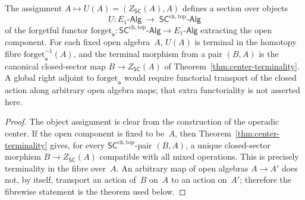 \begin{corollary}
\label{cor:center-functor}
The assignment $A \mapsto U(A) = (Z_{\mathsf{SC}}(A), A)$ defines a
section over objects
\[
U\colon
E_1\text{-}\mathsf{Alg}
\;\longrightarrow\;
\mathsf{SC}^{\mathrm{ch,top}}\text{-}\mathsf{Alg}
\]
of the forgetful functor
$\mathrm{forget}_{\mathsf{o}}\colon
\mathsf{SC}^{\mathrm{ch,top}}\text{-}\mathsf{Alg}
\to E_1\text{-}\mathsf{Alg}$
extracting the open component. For each fixed open algebra~$A$,
$U(A)$ is terminal in the homotopy fibre
$\mathrm{forget}_{\mathsf{o}}^{-1}(A)$, and the terminal morphism
from a pair $(B,A)$ is the canonical closed-sector map
$B\to Z_{\mathsf{SC}}(A)$ of
Theorem~\textup{\ref{thm:center-terminality}}.
A global right adjoint to $\mathrm{forget}_{\mathsf{o}}$ would
require functorial transport of the closed action along arbitrary
open algebra maps; that extra functoriality is not asserted here.
\end{corollary}

\begin{proof}
The object assignment is clear from the construction of the
operadic center. If the open component is fixed to be~$A$, then
Theorem~\ref{thm:center-terminality} gives, for every
$\mathsf{SC}^{\mathrm{ch,top}}$-pair $(B,A)$, a unique
closed-sector morphism $B\to Z_{\mathsf{SC}}(A)$ compatible with all
mixed operations. This is precisely terminality in the fibre
over~$A$. An arbitrary map of open algebras $A\to A'$ does not, by
itself, transport an action of~$B$ on~$A$ to an action on~$A'$;
therefore the fibrewise statement is the theorem used below.
\end{proof}


